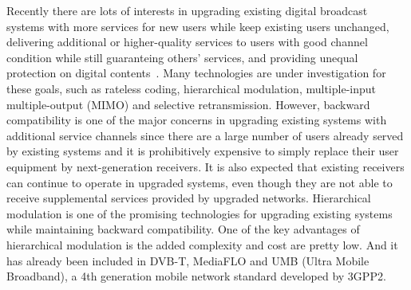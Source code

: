 \documentclass[10pt,fleqn, twocolumn]{IEEEtran}
\begin{document}
Recently there are lots of interests in upgrading existing digital
broadcast systems with more services for new users while keep
existing users unchanged, delivering  additional or higher-quality
services to users with good channel condition while still
guaranteing others' services, and providing unequal protection on
digital contents~\cite{MediaFLO,Jiang05,Ghandi06,UMB}. Many
technologies are under investigation for these goals, such as
rateless coding, hierarchical modulation, multiple-input
multiple-output (MIMO) and selective retransmission. However,
backward compatibility is one of the major concerns in upgrading
existing systems with additional service channels since there are
a large number of users already served by existing systems and it
is prohibitively expensive to simply replace their user equipment
by next-generation receivers. It is also expected that existing
receivers can continue to operate in upgraded systems, even though
they are not able to receive supplemental services provided by
upgraded networks. Hierarchical modulation is one of the promising
technologies for upgrading existing systems while maintaining
backward compatibility. One of the key advantages of hierarchical
modulation is the added complexity and cost are pretty low. And it
has already been included in DVB-T, MediaFLO and UMB (Ultra Mobile
Broadband), a 4th generation mobile network standard developed by
3GPP2.
\end{document}
